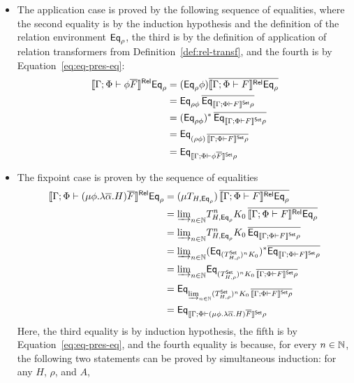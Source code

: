 \documentclass{lmcs}
\theoremstyle{plain}\newtheorem{satz}[thm]{Satz}
\newcommand{\set}{\mathsf{Set}}
\begin{document}
{\begin{itemize}
\item The application case is proved by the following sequence of
  equalities, where the second equality is by the induction hypothesis
  and the definition of the relation environment $\mathsf{Eq}_\rho$, the third
  is by the definition of application of relation transformers from
  Definition~\ref{def:rel-transf}, and the fourth is by
  Equation~\ref{eq:eq-pres-eq}:
\[
\begin{split}
\relsem{\Gamma; \Phi \vdash \phi\ol{F}}\Eq_{\rho} &=
(\Eq_{\rho}\phi)\ol{\relsem{\Gamma; \Phi \vdash F}
\Eq_{\rho}}\\
&= \Eq_{\rho \phi}\, \ol{\Eq_{\setsem{\Gamma; \Phi \vdash F}
  \rho}}\\
&= (\Eq_{\rho \phi})^* \,\ol{\Eq_{\setsem{\Gamma; \Phi \vdash F}
  \rho}}\\
&= \Eq_{(\rho \phi) \,\ol{\setsem{\Gamma; \Phi \vdash F} \rho}}\\
&= \Eq_{\setsem{\Gamma; \Phi \vdash \phi\ol{F}}\rho}
\end{split}
\]
\item  The fixpoint case is proven by the sequence of equalities
\[
\begin{split}
\relsem{\Gamma; \Phi \vdash (\mu \phi.\lambda
  \ol{\alpha}. H)\ol{F}}\Eq_{\rho} 
&=(\mu {T_{H, \Eq_{\rho}}}) \,\ol{\relsem{\Gamma; \Phi \vdash F}\Eq_{\rho}}\\ 
&= \colim{n \in \nat}{T^n_{H, \Eq_{\rho}} K_0}\, \ol{\relsem{\Gamma; \Phi 
  \vdash F}\Eq_{\rho}}\\
&= \colim{n \in \nat}{ T^n_{H, \Eq_{\rho}} K_0 \,\ol{\Eq_{\setsem{\Gamma;
    \Phi \vdash F}\rho}}}\\
&= \colim{n \in \nat}{(\Eq_{(T^\set_{H,\rho})^n K_0})^*
  \ol{\Eq_{\setsem{\Gamma; \Phi \vdash F}\rho}}}\\
&= \colim{n \in \nat}{\Eq_{(T^\set_{H,\rho})^n K_0 \,\ol{\setsem{\Gamma;
        \Phi \vdash F}\rho}}}\\ 
&= \Eq_{\colim{n \in \nat}{ (T^\set_{H,\rho})^n K_0\,
    \ol{\setsem{\Gamma; \Phi \vdash F}\rho}}}\\
&= \Eq_{\setsem{\Gamma; \Phi \vdash (\mu \phi.\lambda
      \ol{\alpha}. H)\ol{F}}\rho}
\end{split}
\]
Here, the third equality is by induction hypothesis, the fifth is by
Equation~\ref{eq:eq-pres-eq}, and the fourth equality is because, for
every $n \in \mathbb{N}$, the following two statements can be proved by
simultaneous induction: for any $H$, $\rho$, and $A$, 
\begin{equation}\label{eq:iel-fix-point-intermediate1}

\end{equation}
\end{itemize}}
\end{document}
